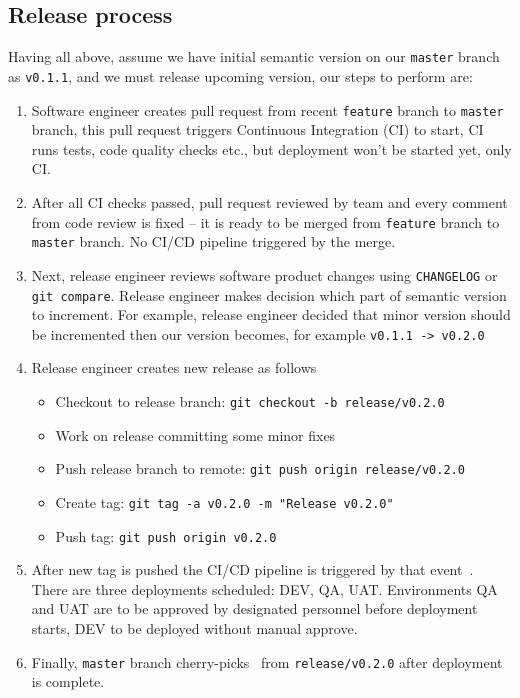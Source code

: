 \subsection{Release process}
Having all above, assume we have initial semantic version on our \texttt{master} branch as \texttt{v0.1.1},
and we must release upcoming version, our steps to perform are:
\begin{enumerate}
    \item Software engineer creates pull request from recent \texttt{feature} branch to \texttt{master} branch,
    this pull request triggers Continuous Integration (CI) to start, CI runs tests, code quality checks etc.,
    but deployment won't be started yet, only CI\@.
    \item After all CI checks passed, pull request reviewed by team and every comment from code review is fixed --
    it is ready to be merged from \texttt{feature} branch to \texttt{master} branch.
    No CI/CD pipeline triggered by the merge.
    \item Next, release engineer reviews software product changes using \texttt{CHANGELOG} or \texttt{git compare}.
    Release engineer makes decision which part of semantic version to increment.
    For example, release engineer decided that minor version should be incremented then our version becomes,
    for example \texttt{v0.1.1 -> v0.2.0}
    \item Release engineer creates new release as follows
    \begin{itemize}
        \item Checkout to release branch: \texttt{git checkout -b release/v0.2.0}
        \item Work on release committing some minor fixes
        \item Push release branch to remote: \texttt{git push origin release/v0.2.0}
        \item Create tag: \texttt{git tag -a v0.2.0 -m "Release v0.2.0"}
        \item Push tag: \texttt{git push origin v0.2.0}
    \end{itemize}
    \item After new tag is pushed the CI/CD pipeline is triggered by that event~\cite{AzurePipelinesTriggers}.
    There are three deployments scheduled: DEV, QA, UAT\@.
    Environments QA and UAT are to be approved by designated personnel before deployment starts,
    DEV to be deployed without manual approve.
    \item Finally, \texttt{master} branch cherry-picks~\cite{CherryPick} from \texttt{release/v0.2.0} after deployment is complete.
\end{enumerate}
